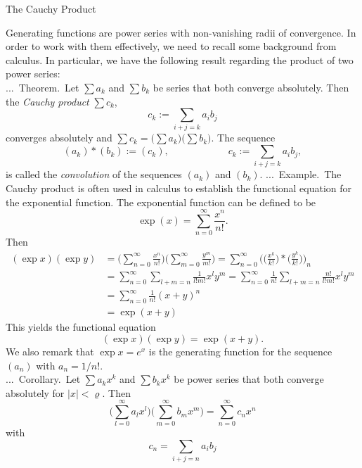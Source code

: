 \documentclass[smaller,hyperref={CJKbookmarks=true}]{beamer}
\newcounter{zhuo}[subsection]
\renewcommand{\thezhuo}{\thesection.\thesubsection.\arabic{zhuo}}
\newenvironment{EXAMPLE}{\stepcounter{zhuo}\alert{\!\thezhuo.~Example.\,}}{}
\newenvironment{COROLLARY}{\stepcounter{zhuo}\alert{\thezhuo.~Corollary.\,}}{}
\newenvironment{THEOREM}{\stepcounter{zhuo}\alert{\thezhuo.~Theorem.\,}}{}
\begin{document}
\begin{frame}{The Cauchy Product}
\begin{spacing}{1}
Generating functions are power series with non-vanishing radii of
convergence. In order to work with them effectively, we need to recall
some background from calculus. In particular, we have the following result
regarding the product of two power series:\\
\begin{THEOREM}
Let $\sum a_k$ and $\sum b_k$ be series that both converge absolutely. Then the \emph{Cauchy product} $\sum c_k$,
\[c_k:=\sum_{i+j=k}a_ib_j\]
converges absolutely and $\sum c_k=\Big(\sum a_k\Big)\Big(\sum b_k\Big)$. The sequence
\[(a_k)\ast(b_k):=(c_k),\qquad\qquad\qquad c_k:=\sum_{i+j=k}a_ib_j,\]
is called the \emph{convolution} of the sequences $(a_k)$ and $(b_k)$.
\end{THEOREM}
\newpage
\begin{EXAMPLE}
The Cauchy product is often used in calculus to establish
the functional equation for the exponential function. The exponential
function can be defined to be
\[\exp(x)=\sum_{n=0}^{\infty}\frac{x^n}{n!}.\]
Then
\begin{equation*}
  \begin{split}
     (\exp x)(\exp y) &=\Big(\sum_{n=0}^{\infty}\frac{x^n}{n!}\Big)\Big(\sum_{m=0}^{\infty}\frac{y^m}{m!}\Big)
     =\sum_{n=0}^{\infty}\bigg(\Big(\frac{x^k}{k!}\Big)\ast\Big(\frac{y^k}{k!}\Big)\bigg)_n \\
       &=\sum_{n=0}^{\infty}\sum_{l+m=n}\frac{1}{l!m!}x^ly^m=\sum_{n=0}^{\infty}\frac{1}{n!}
       \sum_{l+m=n}\frac{n!}{l!m!}x^ly^m \\
       &=\sum_{n=0}^{\infty}\frac{1}{n!}(x+y)^n \\
       &=\exp(x+y)
  \end{split}
\end{equation*}
\end{EXAMPLE}
\!\!This yields the functional equation
\[(\exp x)(\exp y)=\exp(x+y).\]
We also remark that $\exp x=e^x$ is the generating function for the sequence $(a_n)$ with $a_n=1/n!$.\\[6pt]
\begin{COROLLARY}
Let $\sum a_kx^k$ and $\sum b_kx^k$ be power series that both converge absolutely for $|x|<\varrho$. Then
\[\Big(\sum_{l=0}^{\infty}a_lx^l\Big)\Big(\sum_{m=0}^{\infty}b_mx^m\Big)
=\sum_{n=0}^{\infty}c_nx^n\]
with
\[c_n=\sum_{i+j=n}a_ib_j\]
\end{COROLLARY}

\end{spacing}
\end{frame}
\end{document}
